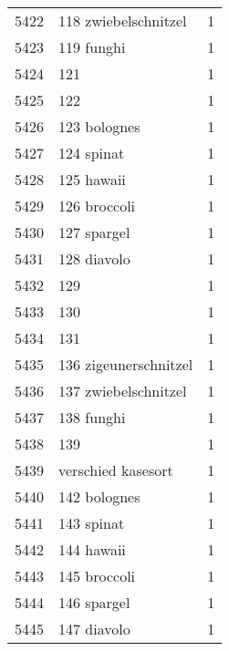 \begin{tabular}{llr}
5422 &                               118 zwiebelschnitzel &      1 \\
5423 &                                         119 funghi &      1 \\
5424 &                                                121 &      1 \\
5425 &                                                122 &      1 \\
5426 &                                       123 bolognes &      1 \\
5427 &                                         124 spinat &      1 \\
5428 &                                         125 hawaii &      1 \\
5429 &                                       126 broccoli &      1 \\
5430 &                                        127 spargel &      1 \\
5431 &                                        128 diavolo &      1 \\
5432 &                                                129 &      1 \\
5433 &                                                130 &      1 \\
5434 &                                                131 &      1 \\
5435 &                              136 zigeunerschnitzel &      1 \\
5436 &                               137 zwiebelschnitzel &      1 \\
5437 &                                         138 funghi &      1 \\
5438 &                                                139 &      1 \\
5439 &                                 verschied kasesort &      1 \\
5440 &                                       142 bolognes &      1 \\
5441 &                                         143 spinat &      1 \\
5442 &                                         144 hawaii &      1 \\
5443 &                                       145 broccoli &      1 \\
5444 &                                        146 spargel &      1 \\
5445 &                                        147 diavolo &      1 \\

\end{tabular}
